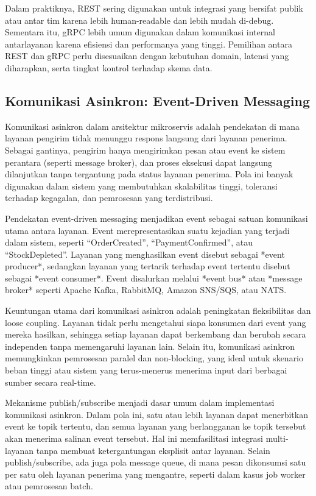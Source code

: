 Dalam praktiknya, REST sering digunakan untuk integrasi yang bersifat publik atau antar tim karena lebih human-readable dan lebih mudah di-debug. Sementara itu, gRPC lebih umum digunakan dalam komunikasi internal antarlayanan karena efisiensi dan performanya yang tinggi. Pemilihan antara REST dan gRPC perlu disesuaikan dengan kebutuhan domain, latensi yang diharapkan, serta tingkat kontrol terhadap skema data.

\subsection{Komunikasi Asinkron: Event-Driven Messaging}

Komunikasi asinkron dalam arsitektur mikroservis adalah pendekatan di mana layanan pengirim tidak menunggu respons langsung dari layanan penerima. Sebagai gantinya, pengirim hanya mengirimkan pesan atau event ke sistem perantara (seperti message broker), dan proses eksekusi dapat langsung dilanjutkan tanpa tergantung pada status layanan penerima. Pola ini banyak digunakan dalam sistem yang membutuhkan skalabilitas tinggi, toleransi terhadap kegagalan, dan pemrosesan yang terdistribusi.

Pendekatan event-driven messaging menjadikan event sebagai satuan komunikasi utama antara layanan. Event merepresentasikan suatu kejadian yang terjadi dalam sistem, seperti “OrderCreated”, “PaymentConfirmed”, atau “StockDepleted”. Layanan yang menghasilkan event disebut sebagai *event producer*, sedangkan layanan yang tertarik terhadap event tertentu disebut sebagai *event consumer*. Event disalurkan melalui *event bus* atau *message broker* seperti Apache Kafka, RabbitMQ, Amazon SNS/SQS, atau NATS.

Keuntungan utama dari komunikasi asinkron adalah peningkatan fleksibilitas dan loose coupling. Layanan tidak perlu mengetahui siapa konsumen dari event yang mereka hasilkan, sehingga setiap layanan dapat berkembang dan berubah secara independen tanpa memengaruhi layanan lain. Selain itu, komunikasi asinkron memungkinkan pemrosesan paralel dan non-blocking, yang ideal untuk skenario beban tinggi atau sistem yang terus-menerus menerima input dari berbagai sumber secara real-time.

Mekanisme publish/subscribe menjadi dasar umum dalam implementasi komunikasi asinkron. Dalam pola ini, satu atau lebih layanan dapat menerbitkan event ke topik tertentu, dan semua layanan yang berlangganan ke topik tersebut akan menerima salinan event tersebut. Hal ini memfasilitasi integrasi multi-layanan tanpa membuat ketergantungan eksplisit antar layanan. Selain publish/subscribe, ada juga pola message queue, di mana pesan dikonsumsi satu per satu oleh layanan penerima yang mengantre, seperti dalam kasus job worker atau pemrosesan batch.

